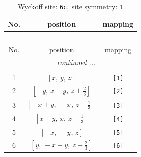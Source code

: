 \documentclass[fleqn,8pt]{jsarticle}
\begin{document}
\renewcommand{\arraystretch}{1.2}
\begin{longtable}{ccc}
\caption{Wyckoff site: {\tt 6c}, site symmetry: {\tt 1}}
 \\
 \hline \hline
No. & position & mapping \\ \hline \endfirsthead

\multicolumn{2}{l}{\tablename\ \thetable{}} \\
 \hline \hline
No. & position & mapping \\ \hline \endhead

 \hline \hline
\multicolumn{2}{r}{\footnotesize\it continued ...} \\ \endfoot

 \hline \hline
\multicolumn{2}{r}{} \\ \endlastfoot

1 & $\left[ x,\, y,\, z \right]$ & {\tt [1]} \\ \hline
2 & $\left[ - y,\, x - y,\, z + \frac{2}{3} \right]$ & {\tt [2]} \\ \hline
3 & $\left[ - x + y,\, - x,\, z + \frac{1}{3} \right]$ & {\tt [3]} \\ \hline
4 & $\left[ x - y,\, x,\, z + \frac{1}{3} \right]$ & {\tt [4]} \\ \hline
5 & $\left[ - x,\, - y,\, z \right]$ & {\tt [5]} \\ \hline
6 & $\left[ y,\, - x + y,\, z + \frac{2}{3} \right]$ & {\tt [6]} \\
\end{longtable}
\end{document}
